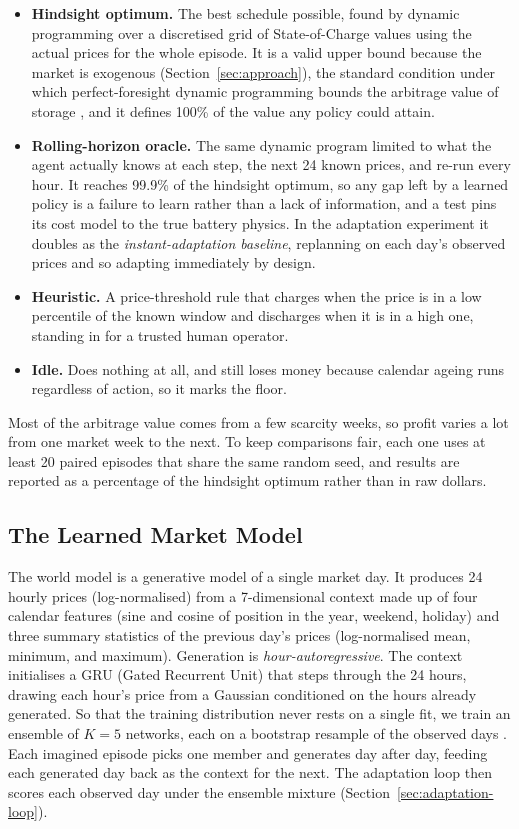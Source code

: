 \documentclass[conference]{IEEEtran}
\begin{document}
\begin{itemize}
\item \textbf{Hindsight optimum.} The best schedule possible, found by dynamic programming over a discretised grid of State-of-Charge values using the actual prices for the whole episode. It is a valid upper bound because the market is exogenous (Section~\ref{sec:approach}), the standard condition under which perfect-foresight dynamic programming bounds the arbitrage value of storage \citep{sioshansi2009storage}, and it defines 100\% of the value any policy could attain.
\item \textbf{Rolling-horizon oracle.} The same dynamic program limited to what the agent actually knows at each step, the next 24 known prices, and re-run every hour. It reaches 99.9\% of the hindsight optimum, so any gap left by a learned policy is a failure to learn rather than a lack of information, and a test pins its cost model to the true battery physics. In the adaptation experiment it doubles as the \emph{instant-adaptation baseline}, replanning on each day's observed prices and so adapting immediately by design.
\item \textbf{Heuristic.} A price-threshold rule that charges when the price is in a low percentile of the known window and discharges when it is in a high one, standing in for a trusted human operator.
\item \textbf{Idle.} Does nothing at all, and still loses money because calendar ageing runs regardless of action, so it marks the floor.
\end{itemize}

Most of the arbitrage value comes from a few scarcity weeks, so profit varies a lot from one market week to the next. To keep comparisons fair, each one uses at least 20 paired episodes that share the same random seed, and results are reported as a percentage of the hindsight optimum rather than in raw dollars.

\subsection{The Learned Market Model}
\label{sec:market-model}

The world model is a generative model of a single market day. It produces 24 hourly prices (log-normalised) from a 7-dimensional context made up of four calendar features (sine and cosine of position in the year, weekend, holiday) and three summary statistics of the previous day's prices (log-normalised mean, minimum, and maximum). Generation is \emph{hour-autoregressive}. The context initialises a GRU (Gated Recurrent Unit) \citep{cho2014gru} that steps through the 24 hours, drawing each hour's price from a Gaussian conditioned on the hours already generated. So that the training distribution never rests on a single fit, we train an ensemble of $K=5$ networks, each on a bootstrap resample of the observed days \citep{lakshminarayanan2017ensembles, osband2018rpf}. Each imagined episode picks one member and generates day after day, feeding each generated day back as the context for the next. The adaptation loop then scores each observed day under the ensemble mixture (Section~\ref{sec:adaptation-loop}).
\end{document}
